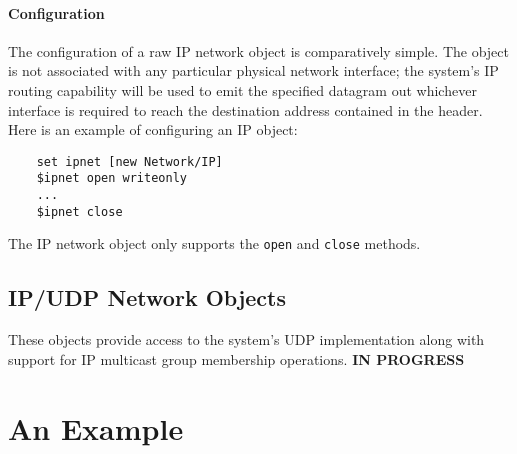 \paragraph{Configuration}
The configuration of a raw IP network object is comparatively
simple.
The object is not associated with any particular physical network
interface; the system's IP routing capability will be used to
emit the specified datagram out whichever interface is required
to reach the destination address contained in the header.
Here is an example of configuring an IP object:
\begin{verbatim}
    set ipnet [new Network/IP]
    $ipnet open writeonly
    ...
    $ipnet close
\end{verbatim}
The IP network object only supports the {\tt open} and {\tt close}
methods.

\subsection{IP/UDP Network Objects}

These objects provide access to the system's UDP implementation
along with support for IP multicast group membership operations.
{\bf IN PROGRESS}

\section{An Example}

